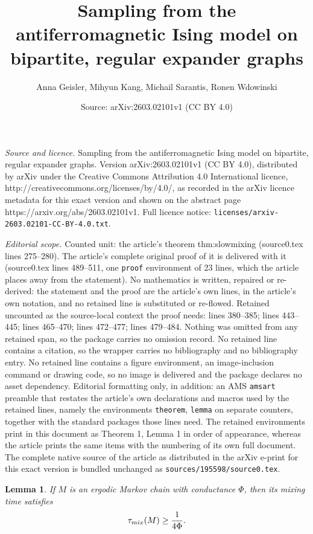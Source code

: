 \documentclass[10pt,a4paper]{amsart}
\title{Sampling from the antiferromagnetic Ising model on bipartite, regular expander graphs}
\author{Anna Geisler, Mihyun Kang, Michail Sarantis, Ronen Wdowinski}
\date{Source: arXiv:2603.02101v1 (CC BY 4.0)}
\newtheorem{lemma}{Lemma}
\newcommand{\tmix}{\tau_{\rm{mix}}}
\begin{document}
\maketitle

\noindent\emph{Source and licence.} Sampling from the antiferromagnetic Ising model on bipartite, regular expander graphs. Version arXiv:2603.02101v1 (CC BY 4.0), distributed by arXiv under the Creative Commons Attribution 4.0 International licence, http://creativecommons.org/licenses/by/4.0/, as recorded in the arXiv licence metadata for this exact version and shown on the abstract page https://arxiv.org/abs/2603.02101v1. Full licence notice: \texttt{licenses/arxiv-2603.02101-CC-BY-4.0.txt}.\par\smallskip

\noindent\textit{Editorial scope.} Counted unit: the article's theorem thm:slowmixing (source0.tex lines 275--280). The article's complete original proof of it is delivered with it (source0.tex lines 489--511, one \texttt{proof} environment of 23 lines, which the article places away from the statement). No mathematics is written, repaired or re-derived: the statement and the proof are the article's own lines, in the article's own notation, and no retained line is substituted or re-flowed.  Retained uncounted as the source-local context the proof needs: lines 380--385; lines 443--445; lines 465--470; lines 472--477; lines 479--484.  Nothing was omitted from any retained span, so the package carries no omission record.  No retained line contains a citation, so the wrapper carries no bibliography and no bibliography entry.  No retained line contains a figure environment, an image-inclusion command or drawing code, so no image is delivered and the package declares no asset dependency.  Editorial formatting only, in addition: an AMS \texttt{amsart} preamble that restates the article's own declarations and macros used by the retained lines, namely the environments \texttt{theorem}, \texttt{lemma} on separate counters, together with the standard packages those lines need.  The retained environments print in this document as Theorem 1, Lemma 1 in order of appearance, whereas the article prints the same items with the numbering of its own full document.  The complete native source of the article as distributed in the arXiv e-print for this exact version is bundled unchanged as \texttt{sources/195598/source0.tex}.
\begin{lemma} \label{lem:conduc_mix}
If $M$ is an ergodic Markov chain with conductance $\Phi$, then its mixing time satisfies
    \begin{equation*}
        \tmix(M)\geq\frac{1}{4\Phi}.
    \end{equation*}
\end{lemma}
\end{document}
